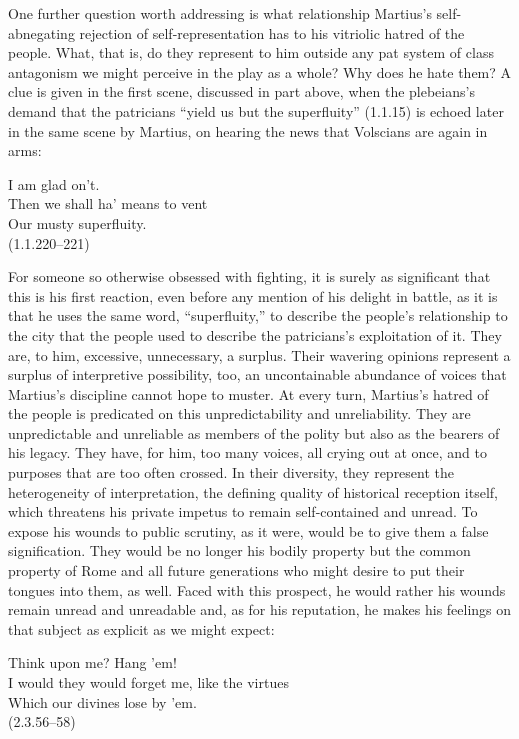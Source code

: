 One further question worth addressing is what relationship Martius's self-abnegating rejection of self-representation has to his vitriolic hatred of the people.
What, that is, do they represent to him outside any pat system of class antagonism we might perceive in the play as a whole?
Why does he hate them?
A clue is given in the first scene, discussed in part above, when the plebeians's demand that the patricians ``yield us but the superfluity'' (1.1.15) is echoed later in the same scene by Martius, on hearing the news that Volscians are again in arms:
\begin{vq}
I am glad on't.\\
Then we shall ha' means to vent\\
Our musty superfluity.\\
\hfill(1.1.220--221)
\end{vq}
For someone so otherwise obsessed with fighting, it is surely as significant that this is his first reaction, even before any mention of his delight in battle, as it is that he uses the same word, ``superfluity,'' to describe the people's relationship to the city that the people used to describe the patricians's exploitation of it.
They are, to him, excessive, unnecessary, a surplus.
Their wavering opinions represent a surplus of interpretive possibility, too, an uncontainable abundance of voices that Martius's discipline cannot hope to muster.
At every turn, Martius's hatred of the people is predicated on this unpredictability and unreliability.
They are unpredictable and unreliable as members of the polity but also as the bearers of his legacy.
They have, for him, too many voices, all crying out at once, and to purposes that are too often crossed.
In their diversity, they represent the heterogeneity of interpretation, the defining quality of historical reception itself, which threatens his private impetus to remain self-contained and unread.
To expose his wounds to public scrutiny, as it were, would be to give them a false signification.
They would be no longer his bodily property but the common property of Rome and all future generations who might desire to put their tongues into them, as well.
Faced with this prospect, he would rather his wounds remain unread and unreadable and, as for his reputation, he makes his feelings on that subject as explicit as we might expect:
\begin{vq}
Think upon me? Hang 'em!\\
I would they would forget me, like the virtues\\
Which our divines lose by 'em.\\
\hfill(2.3.56--58)
\end{vq}
